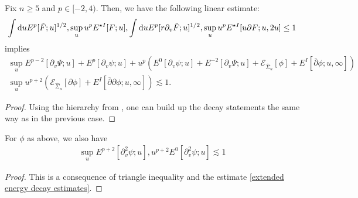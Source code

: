 \documentclass[11pt, oneside]{amsart}
\begin{document}
\begin{lemma}\label{energy decay p<4}
	Fix $n\geq5$ and $p\in[-2,4)$. Then, we have the following linear estimate:
	\begin{equation*}
		\begin{gathered}
			\int\mathrm{d} u E^{p}[\tilde{F};u]^{1/2},\sup_uu^pE^{\star I}[F;u],\int\mathrm{d} u E^{p}[r\partial_v\tilde{F};u]^{1/2},\sup_uu^pE^{\star I}[u\partial F;u,2u]\leq1
		\end{gathered}
	\end{equation*}
	implies
	\begin{equation}\label{extended energy decay estimates}
		\begin{gathered}
			\sup_u E^{p-2}[\partial_v\Psi;u]+E^p[\partial_v\psi;u]+ u^p(E^0[\partial_v\psi;u]+E^{-2}[\partial_v\Psi;u]+\mathcal{E}_{\hat{\Sigma}_u}[\phi]+E^{I}[\overline{\partial}\phi;u,\infty])\\
			\sup_uu^{p+2}(\mathcal{E}_{\hat{\Sigma}_u}[\partial\phi]+E^{I}[\overline{\partial}\partial\phi;u,\infty])\lesssim1.
		\end{gathered}
	\end{equation}
\end{lemma}
\begin{proof}
	Using the hierarchy from \cite{angelopoulos_vector_2018}, one can build up the decay statements the same way as in the previous case.
\end{proof}


\begin{cor}\label{Psi to psi}
	For $\phi$ as above, we also have
	\begin{equation*}
		\begin{gathered}
			\sup_uE^{p+2}[\partial_v^2\psi;u],u^{p+2}E^0[\partial_v^2\psi;u]\lesssim1
		\end{gathered}
	\end{equation*}
\end{cor}


\begin{proof}
	This is a consequence of triangle inequality and the estimate \cref{extended energy decay estimates}.
\end{proof}
\end{document}

